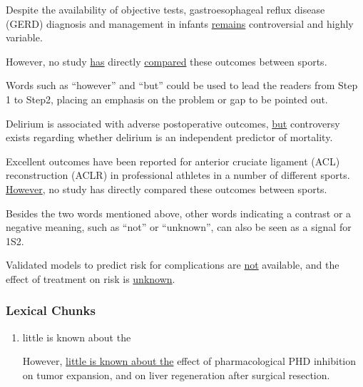 \documentclass{ctexbook}
\begin{document}
    \begin{eg}{}
      Despite the availability of objective tests, gastroesophageal reflux disease (GERD) diagnosis and management in infants \uline{remains} controversial and highly variable.
    \end{eg}

    \begin{eg}{}
      However, no study \uline{has} directly \uline{compared} these outcomes between sports.
    \end{eg}

    Words such as ``however'' and ``but'' could be used to lead the readers from Step 1 to Step2, placing an emphasis on the problem or gap to be pointed out.

    \begin{eg}{}
      Delirium is associated with adverse postoperative outcomes, \uline{but} controversy exists regarding whether delirium is an independent predictor of mortality.
    \end{eg}

    \begin{eg}{}
      Excellent outcomes have been reported for anterior cruciate ligament (ACL) reconstruction (ACLR) in professional athletes in a number of different sports. \uline{However}, no study has directly compared these outcomes between sports.
    \end{eg}

    Besides the two words mentioned above, other words indicating a contrast or a negative meaning, such as ``not'' or ``unknown'', can also be seen as a signal for 1S2.

    \begin{eg}{}
      Validated models to predict risk for complications are \uline{not} available, and the effect of treatment on risk is \uline{unknown}.
    \end{eg}

    \subsubsection{Lexical Chunks}

    \begin{enumerate}
      \item little is known about the
      \begin{eg}{}
        However, \uline{little is known about the} effect of pharmacological PHD inhibition on tumor expansion, and on liver regeneration after surgical resection.
      \end{eg}
    \end{enumerate}
\end{document}
